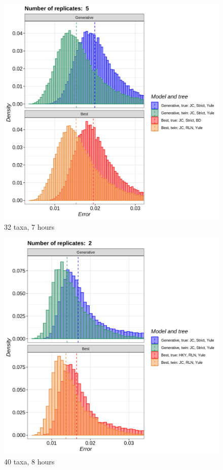 \begin{figure}[H]
  \includegraphics[width=\textwidth]{pirouette_example_41/errors.png}
  \caption{32 taxa, 7 hours}
\end{figure}

\begin{figure}[H]
  \includegraphics[width=\textwidth]{pirouette_example_42/errors.png}
  \caption{40 taxa, 8 hours}
\end{figure}

